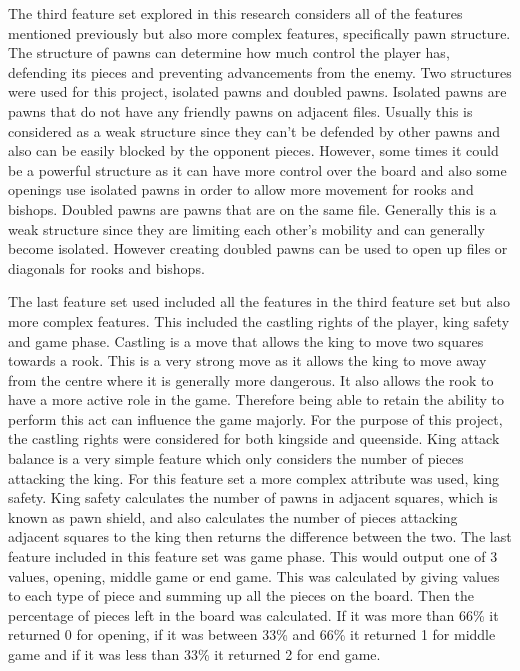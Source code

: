 The third feature set explored in this research considers all of the features mentioned previously but also more complex features, specifically pawn structure. The structure of pawns can determine how much control the player has, defending its pieces and preventing advancements from the enemy. Two structures were used for this project, isolated pawns and doubled pawns. Isolated pawns are pawns that do not have any friendly pawns on adjacent files. Usually this is considered as a weak structure since they can't be defended by other pawns and also can be easily blocked by the opponent pieces. However, some times it could be a powerful structure as it can have more control over the board and also some openings use isolated pawns in order to allow more movement for rooks and bishops. 
Doubled pawns are pawns that are on the same file. Generally this is a weak structure since they are limiting each other's mobility and can generally become isolated. However creating doubled pawns can be used to open up files or diagonals for rooks and bishops.

The last feature set used included all the features in the third feature set but also more complex features. This included the castling rights of the player, king safety and game phase. Castling is a move that allows the king to move two squares towards a rook. This is a very strong move as it allows the king to move away from the centre where it is generally more dangerous. It also allows the rook to have a more active role in the game. Therefore being able to retain the ability to perform this act can influence the game majorly. For the purpose of this project, the castling rights were considered for both kingside and queenside. King attack balance is a very simple feature which only considers the number of pieces attacking the king.  For this feature set a more complex attribute was used, king safety. King safety calculates the number of pawns in adjacent squares, which is known as pawn shield, and also calculates the number of pieces attacking adjacent squares to the king then returns the difference between the two. The last feature included in this feature set was game phase. This would output one of 3 values, opening, middle game or end game. This was calculated by giving values to each type of piece and summing up all the pieces on the board. Then the percentage of pieces left in the board was calculated. If it was more than 66\% it returned 0 for opening, if it was between 33\% and 66\% it returned 1 for middle game and if it was less than 33\% it returned 2 for end game.

